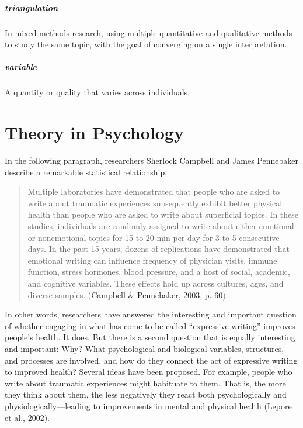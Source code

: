 \documentclass[
]{krantz}
\begin{document}
\hypertarget{triangulation}{%
\paragraph*{triangulation}\label{triangulation}}

In mixed methods research, using multiple quantitative and qualitative methods to study the same topic, with the goal of converging on a single interpretation.

\hypertarget{variable}{%
\paragraph*{variable}\label{variable}}

A quantity or quality that varies across individuals.

\hypertarget{theory-in-psychology}{%
\chapter{Theory in Psychology}\label{theory-in-psychology}}

In the following paragraph, researchers Sherlock Campbell and James Pennebaker describe a remarkable statistical relationship.

\begin{quote}
Multiple laboratories have demonstrated that people who are asked to write about traumatic experiences subsequently exhibit better physical health than people who are asked to write about superficial topics. In these studies, individuals are randomly assigned to write about either emotional or nonemotional topics for 15 to 20 min per day for 3 to 5 consecutive days. In the past 15 years, dozens of replications have demonstrated that emotional writing can influence frequency of physician visits, immune function, stress hormones, blood pressure, and a host of social, academic, and cognitive variables. These effects hold up across cultures, ages, and diverse samples. (\protect\hyperlink{ref-campbell2003secret}{Campbell \& Pennebaker, 2003, p. 60}).
\end{quote}

In other words, researchers have answered the interesting and important question of whether engaging in what has come to be called ``expressive writing'' improves people's health. It does. But there is a second question that is equally interesting and important: Why? What psychological and biological variables, structures, and processes are involved, and how do they connect the act of expressive writing to improved health? Several ideas have been proposed. For example, people who write about traumatic experiences might habituate to them. That is, the more they think about them, the less negatively they react both psychologically and physiologically---leading to improvements in mental and physical health (\protect\hyperlink{ref-lepore2002expressive}{Lepore et al., 2002}).
\end{document}
